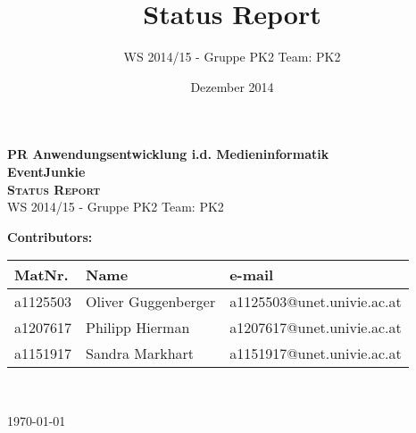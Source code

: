 \documentclass{article}
\title{Status Report}
\author{WS 2014/15 - Gruppe PK2 Team: PK2}
\date{Dezember 2014}
\begin{document}
\begin{titlepage}
    \begin{center}
    \huge \textbf{\textsf{PR Anwendungsentwicklung i.d. Medieninformatik}} \\
    \vspace{1cm} \textbf{EventJunkie} \\
    \vspace{2cm}
    \LARGE\textbf{\textsc{Status Report}}\\
    \vspace{0.5cm}
    \large {WS 2014/15 - Gruppe PK2 Team: PK2}\\
    \end{center}
    
    \vspace{2cm}
    \normalsize \textbf{Contributors: }
    \begin{center} 
    \normalsize{
    \begin{tabular}{lll}
    	\textbf{MatNr.} & \textbf{Name} & \textbf{e-mail} \\ \hline
    	a1125503 & Oliver Guggenberger & a1125503@unet.univie.ac.at \\
    	a1207617 & Philipp Hierman & a1207617@unet.univie.ac.at \\
    	a1151917 & Sandra Markhart & a1151917@unet.univie.ac.at \\
    \end{tabular}\\
    }
    
    \vspace{1.5cm}
    
    
    \end{center}
    \vspace{0.5cm}
    \begin{center} 
    \vspace{3.3cm}
   \today \\
    \end{center}
   

\end{titlepage}
\end{document}
